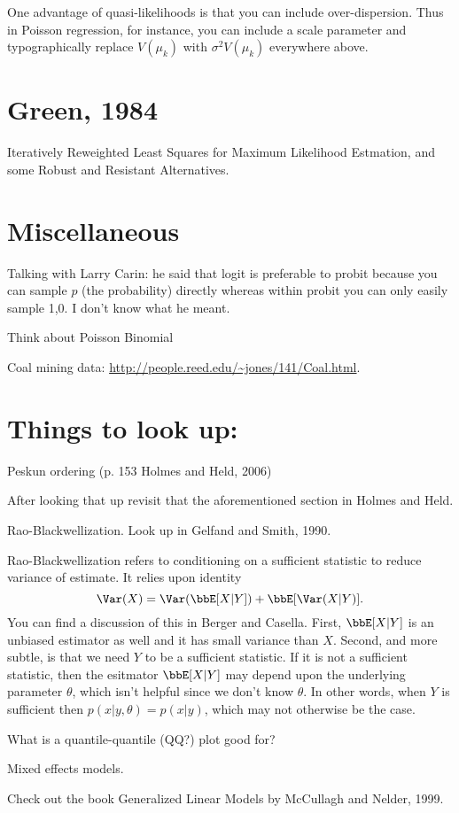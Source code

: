 \documentclass{article}
\begin{document}
One advantage of quasi-likelihoods is that you can include over-dispersion.
Thus in Poisson regression, for instance, you can include a scale parameter and
typographically replace $V(\mu_k)$ with $\sigma^2 V(\mu_k)$ everywhere above.

\section{Green, 1984}

Iteratively Reweighted Least Squares for Maximum Likelihood Estmation, and some
Robust and Resistant Alternatives.


\section{Miscellaneous}

\begin{outline}

\1 Talking with Larry Carin: he said that logit is preferable to probit because
you can sample $p$ (the probability) directly whereas within probit you can only
easily sample 1,0.  I don't know what he meant.

\1 Think about Poisson Binomial

\1 Coal mining data: \url{http://people.reed.edu/~jones/141/Coal.html}.

\end{outline}

\section{Things to look up:}

\begin{outline}

\1 Peskun ordering (p. 153 Holmes and Held, 2006)

  \2 After looking that up revisit that the aforementioned section in Holmes and
  Held.

\1 Rao-Blackwellization.  Look up in Gelfand and Smith, 1990.

\2 Rao-Blackwellization refers to conditioning on a sufficient statistic to
reduce variance of estimate.  It relies upon identity
\[
\Var(X) = \Var(\bbE[X|Y]) + \bbE[\Var(X|Y)].
\]
You can find a discussion of this in Berger and Casella.  First, $\bbE[X|Y]$ is
an unbiased estimator as well and it has small variance than $X$.  Second, and
more subtle, is that we need $Y$ to be a sufficient statistic.  If it is not a
sufficient statistic, then the esitmator $\bbE[X|Y]$ may depend upon the
underlying parameter $\theta$, which isn't helpful since we don't know $\theta$.
In other words, when $Y$ is sufficient then $p(x | y, \theta) = p(x | y)$, which
may not otherwise be the case.


\1 What is a quantile-quantile (QQ?) plot good for?

\1 Mixed effects models.

\1 Check out the book Generalized Linear Models by McCullagh and Nelder, 1999.

\end{outline}

{}

\end{document}
